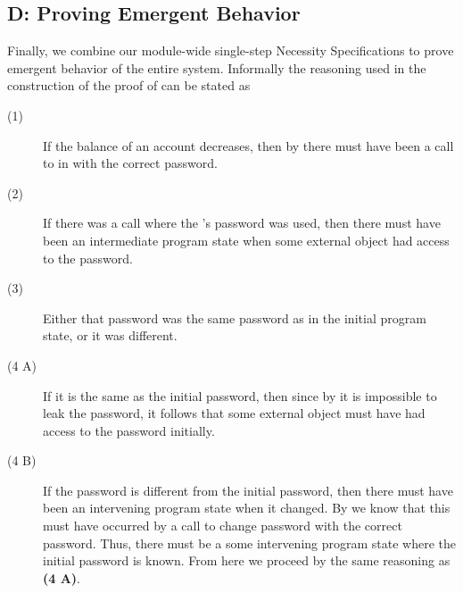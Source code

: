\subsection{D: Proving Emergent Behavior}
Finally, we combine our module-wide single-step Necessity Specifications to 
prove emergent behavior of the entire system. Informally the
reasoning used in the construction of the proof of  can be stated as
\begin{description}
\item [(1)]
If the balance of an account decreases, then
by  there must have been a call
to  in  with the correct password.
\item [(2)]
If there was a call where the 's password 
was used, then there must have been an intermediate program state
when some external object had access to the password.
\item [(3)]
Either that password was the same password as in the initial 
program state, or it was different.
\item [(4 A)]
If it is the same as the initial password, then since by 
it is impossible to leak the password, it follows that some external object 
must have had access to the password initially.
\item [(4 B)]
If the password is different from the initial password, 
then there must have been an intervening program state when it 
changed. By  we know that this must have occurred
by a call to change password with the correct password. Thus,
there must be a some intervening program state where the initial
password is known. From here we proceed by the same reasoning 
as \textbf{(4 A)}.
\end{description}
